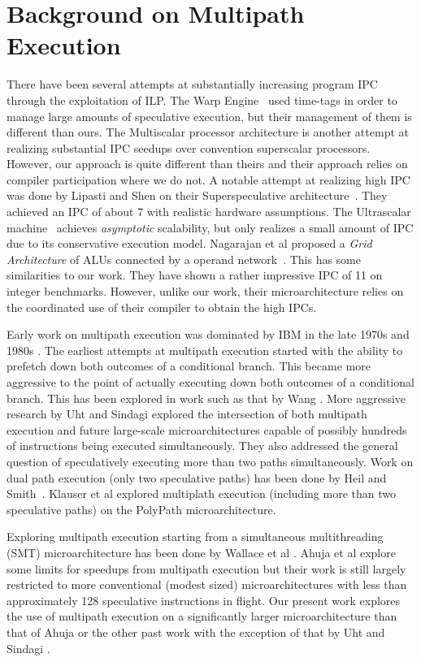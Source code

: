 %
\section{Background on Multipath Execution}
%
There have been several attempts at substantially increasing
program IPC through the exploitation of ILP.
The Warp Engine~\cite{Cle95}
used time-tags in order to manage large amounts of speculative execution,
but their management of them is different than ours.
The Multiscalar processor architecture \cite{Soh95}
is another attempt at
realizing substantial IPC seedups over convention superscalar
processors.  However, our approach is quite different than theirs
and their approach relies on compiler participation where we do not.
A notable attempt at realizing high IPC was done by
Lipasti and Shen on their Superspeculative
architecture~\cite{Lip97}.  They achieved an IPC of
about 7 with realistic hardware assumptions.
The Ultrascalar machine~\cite{Hen00}
achieves {\em asymptotic} scalability,
but only realizes a small amount of IPC due to its 
conservative execution model.
Nagarajan et al proposed a {\em Grid Architecture} of ALUs
connected by a operand network~\cite{Nag01}.  
This has some similarities to our work.
They have shown a rather impressive IPC of 11 on integer benchmarks.
However, unlike our work, their microarchitecture
relies on the coordinated use of their compiler to obtain the high IPCs.

Early work on multipath execution was
dominated by IBM in the
late 1970s and 1980s \cite{Conners79}.
The earliest attempts at multipath
execution started with the ability to prefetch down both
outcomes of a conditional branch.  This became more aggressive
to the point of actually executing down both outcomes of
a conditional branch.  This has
been explored in work such as that by
Wang \cite{Wang90}.  
More aggressive research by Uht and
Sindagi \cite{Uht95} explored the intersection of both
multipath execution and future large-scale microarchitectures
capable of possibly hundreds of instructions being executed simultaneously.
They also addressed the general question of speculatively executing
more than two paths simultaneously.
Work on dual path execution (only two speculative paths) has
been done by Heil and Smith~\cite{Heil96}.
Klauser et al explored multiplath execution (including more than two
speculative paths)
on the PolyPath microarchitecture.

Exploring multipath execution starting from a simultaneous multithreading (SMT)
microarchitecture has been done by
Wallace et al \cite{Wallace98}.  
Ahuja et al \cite{Ahuja98} explore some limits for speedups from
multipath execution but their work is still largely restricted to more
conventional (modest sized) microarchitectures with less than approximately
128
speculative instructions in flight.  Our present work explores the use
of multipath execution on a significantly larger microarchitecture than
that of Ahuja or the other past work with the exception of that by
Uht and 
Sindagi \cite{Uht95}.
